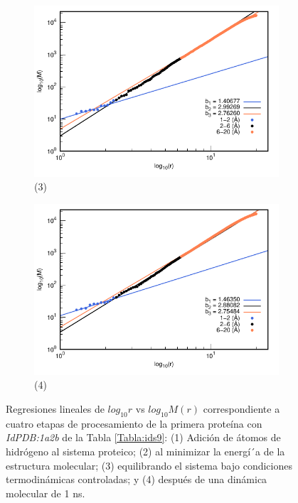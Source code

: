 \begin{figure}[H]
	\vspace{0cm} %
	
	\hspace{-0.3cm} 
	\begin{subfigure}{0.49\textwidth}
		\centering
		\includegraphics[width=\linewidth,page=1]{graphs/PDBs/1a2b/1a2bEq.pdf}
		\caption{(3)}
	\end{subfigure}
	\hspace{0.2cm}
	\begin{subfigure}{0.49\textwidth} %
		\centering
		\includegraphics[width=\linewidth,page=1]{graphs/PDBs/1a2b/1a2b1ns.pdf}
		\caption{(4)}
	\end{subfigure}
	
	\caption{
		Regresiones lineales de $log_{10}r$ vs $log_{10}M(r)$ correspondiente a cuatro etapas de procesamiento de la primera prote\'{i}na con \textit{IdPDB:1a2b} de la Tabla \ref{Tabla:ids9}: (1) Adici\'{o}n de \'{a}tomos de hidr\'{o}geno al sistema proteico; (2) al minimizar la energ\'{i´}a de la estructura molecular; (3) equilibrando el sistema bajo condiciones termodin\'{a}micas controladas; y (4) despu\'{e}s de una din\'{a}mica molecular de 1 ns.}
	\label{fig:1a2b}
\end{figure}

